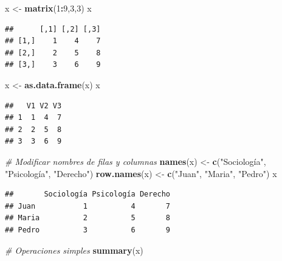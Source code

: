 \documentclass[]{article}
\newenvironment{Shaded}{\begin{snugshade}}{\end{snugshade}}
\newcommand{\CommentTok}[1]{\textcolor[rgb]{0.56,0.35,0.01}{\textit{#1}}}
\newcommand{\DecValTok}[1]{\textcolor[rgb]{0.00,0.00,0.81}{#1}}
\newcommand{\KeywordTok}[1]{\textcolor[rgb]{0.13,0.29,0.53}{\textbf{#1}}}
\newcommand{\NormalTok}[1]{#1}
\newcommand{\OperatorTok}[1]{\textcolor[rgb]{0.81,0.36,0.00}{\textbf{#1}}}
\newcommand{\StringTok}[1]{\textcolor[rgb]{0.31,0.60,0.02}{#1}}
\begin{document}
\begin{Shaded}
\begin{Highlighting}[]
\NormalTok{x <-}\StringTok{ }\KeywordTok{matrix}\NormalTok{(}\DecValTok{1}\OperatorTok{:}\DecValTok{9}\NormalTok{,}\DecValTok{3}\NormalTok{,}\DecValTok{3}\NormalTok{)}
\NormalTok{x}
\end{Highlighting}
\end{Shaded}

\begin{verbatim}
##      [,1] [,2] [,3]
## [1,]    1    4    7
## [2,]    2    5    8
## [3,]    3    6    9
\end{verbatim}

\begin{Shaded}
\begin{Highlighting}[]
\NormalTok{x <-}\StringTok{ }\KeywordTok{as.data.frame}\NormalTok{(x)}
\NormalTok{x}
\end{Highlighting}
\end{Shaded}

\begin{verbatim}
##   V1 V2 V3
## 1  1  4  7
## 2  2  5  8
## 3  3  6  9
\end{verbatim}

\begin{Shaded}
\begin{Highlighting}[]
\CommentTok{# Modificar nombres de filas y columnas}
\KeywordTok{names}\NormalTok{(x) <-}\StringTok{ }\KeywordTok{c}\NormalTok{(}\StringTok{"Sociología"}\NormalTok{, }\StringTok{"Psicología"}\NormalTok{, }\StringTok{"Derecho"}\NormalTok{)}
\KeywordTok{row.names}\NormalTok{(x) <-}\StringTok{ }\KeywordTok{c}\NormalTok{(}\StringTok{"Juan"}\NormalTok{, }\StringTok{"Maria"}\NormalTok{, }\StringTok{"Pedro"}\NormalTok{)}
\NormalTok{x}
\end{Highlighting}
\end{Shaded}

\begin{verbatim}
##       Sociología Psicología Derecho
## Juan           1          4       7
## Maria          2          5       8
## Pedro          3          6       9
\end{verbatim}

\begin{Shaded}
\begin{Highlighting}[]
\CommentTok{# Operaciones simples}
\KeywordTok{summary}\NormalTok{(x)}
\end{Highlighting}
\end{Shaded}
\end{document}
